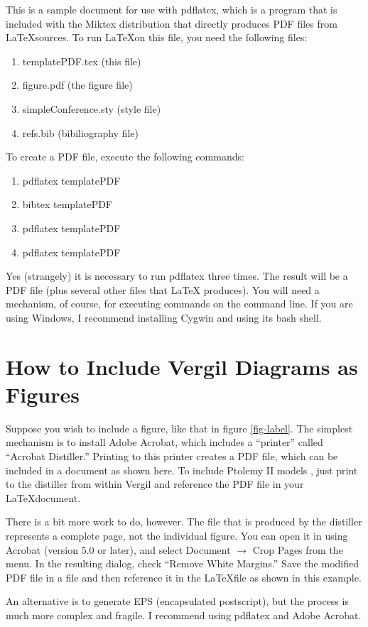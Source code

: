 \documentclass[10pt,twocolumn]{article}
\begin{document}
This is a sample document for use with pdflatex, which is
a program that is included with the Miktex distribution
that directly produces PDF files from \LaTeX sources.
To run \LaTeX on this file, you need the following files:
\begin{enumerate}
\item templatePDF.tex (this file)
\item figure.pdf (the figure file)
\item simpleConference.sty (style file)
\item refs.bib (bibiliography file)
\end{enumerate}
\noindent
To create a PDF file, execute the following commands:
\begin{enumerate}
\item pdflatex templatePDF
\item bibtex templatePDF
\item pdflatex templatePDF
\item pdflatex templatePDF
\end{enumerate}
\noindent
Yes (strangely) it is necessary to run pdflatex three times.
The result will be a PDF file (plus several other files that \LaTeX
produces).  You will need a mechanism, of course, for executing
commands on the command line. If you are using Windows, I recommend
installing Cygwin and using its bash shell.

\section{How to Include Vergil Diagrams as Figures}

Suppose you wish to include a figure, like that in figure \ref{fig-label}.
The simplest mechanism is to install Adobe Acrobat, which includes
a ``printer'' called ``Acrobat Distiller.'' Printing to this printer
creates a PDF file, which can be included in a document as shown
here.  To include Ptolemy II models \cite{PtolemyVol1:04},
just print to the distiller from within Vergil and reference
the PDF file in your \LaTeX document.

There is a bit more work to do, however.
The file that is produced by the distiller represents
a complete page, not the individual figure.
You can open it in using Acrobat (version 5.0 or later),
and select Document $\rightarrow$ Crop Pages from the menu.
In the resulting dialog, check ``Remove White Margins.''
Save the modified PDF file in a file and then reference
it in the \LaTeX file as shown in this example.

An alternative is to generate EPS (encapsulated postscript),
but the process is much more complex and fragile.
I recommend using pdflatex and Adobe Acrobat.



\end{document}
